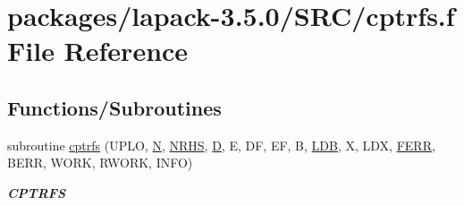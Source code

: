 \hypertarget{cptrfs_8f}{}\section{packages/lapack-\/3.5.0/\+S\+R\+C/cptrfs.f File Reference}
\label{cptrfs_8f}
\subsection*{Functions/\+Subroutines}
\begin{DoxyCompactItemize}
\item 
subroutine \hyperlink{group__complexPTcomputational_ga2d92211a4a19cad8b7c36d9aa1602069}{cptrfs} (U\+P\+L\+O, \hyperlink{polmisc_8c_a0240ac851181b84ac374872dc5434ee4}{N}, \hyperlink{example__user_8c_aa0138da002ce2a90360df2f521eb3198}{N\+R\+H\+S}, \hyperlink{odrpack_8h_a7dae6ea403d00f3687f24a874e67d139}{D}, E, D\+F, E\+F, B, \hyperlink{example__user_8c_a50e90a7104df172b5a89a06c47fcca04}{L\+D\+B}, X, L\+D\+X, \hyperlink{superlu__enum__consts_8h_af00a42ecad444bbda75cde1b64bd7e72a78fd14d7abebae04095cfbe02928f153}{F\+E\+R\+R}, B\+E\+R\+R, W\+O\+R\+K, R\+W\+O\+R\+K, I\+N\+F\+O)
\begin{DoxyCompactList}\small\item\em {\bfseries C\+P\+T\+R\+F\+S} \end{DoxyCompactList}\end{DoxyCompactItemize}
